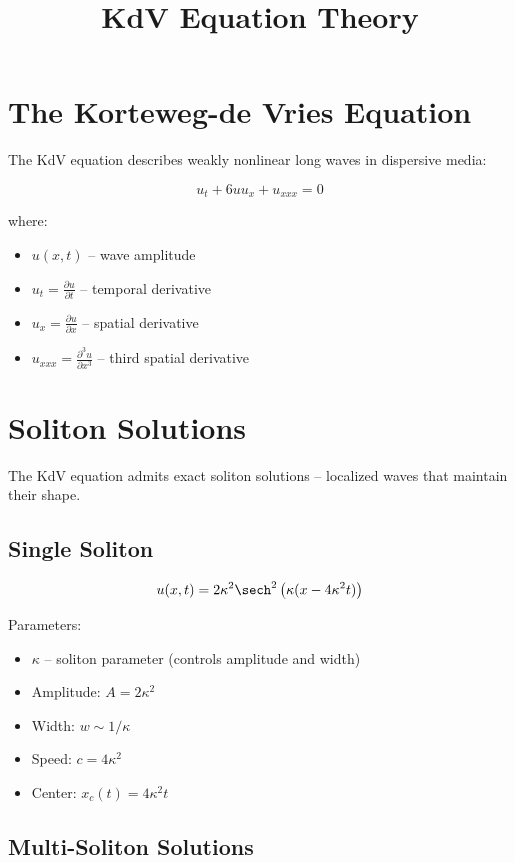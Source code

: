 \documentclass{article}
\title{KdV Equation Theory}
\author{}
\date{}
\begin{document}
\section{The Korteweg-de Vries Equation}

The KdV equation describes weakly nonlinear long waves in dispersive media:

\begin{equation}
u_t + 6uu_x + u_{xxx} = 0
\end{equation}

where:
\begin{itemize}
    \item $u(x,t)$ -- wave amplitude
    \item $u_t = \frac{\partial u}{\partial t}$ -- temporal derivative
    \item $u_x = \frac{\partial u}{\partial x}$ -- spatial derivative
    \item $u_{xxx} = \frac{\partial^3 u}{\partial x^3}$ -- third spatial derivative
\end{itemize}

\section{Soliton Solutions}

The KdV equation admits exact soliton solutions -- localized waves that maintain their shape.

\subsection{Single Soliton}

\begin{equation}
u(x,t) = 2\kappa^2 \sech^2\left(\kappa(x - 4\kappa^2 t)\right)
\end{equation}

Parameters:
\begin{itemize}
    \item $\kappa$ -- soliton parameter (controls amplitude and width)
    \item Amplitude: $A = 2\kappa^2$
    \item Width: $w \sim 1/\kappa$
    \item Speed: $c = 4\kappa^2$
    \item Center: $x_c(t) = 4\kappa^2 t$
\end{itemize}

\subsection{Multi-Soliton Solutions}
\end{document}
